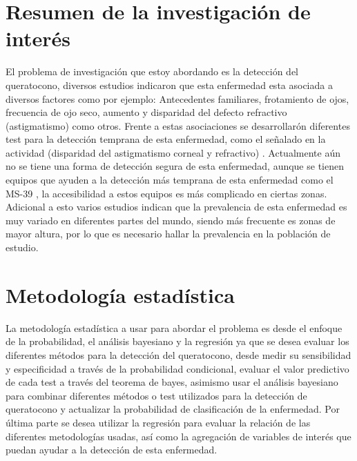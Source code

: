 
\newpage

\section{Resumen de la investigación de interés}
El problema de investigación que estoy abordando es la detección del queratocono, diversos estudios indicaron que esta enfermedad esta asociada a diversos factores como por ejemplo: Antecedentes familiares, frotamiento de ojos, frecuencia de ojo seco, aumento y disparidad del defecto refractivo (astigmatismo) como otros. Frente a estas asociaciones se desarrollarón diferentes test para la detección temprana de esta enfermedad, como el señalado en la actividad (disparidad del astigmatismo corneal y refractivo) \cite{sinjab2021corneal}. Actualmente aún no se tiene una forma de detección segura de esta enfermedad, aunque se tienen equipos que ayuden a la detección más temprana de esta enfermedad como el MS-39 \cite{elkitkat2022accuracy}, la accesibilidad a estos equipos es más complicado en ciertas zonas. Adicional a esto varios estudios indican que la prevalencia de esta enfermedad es muy variado en diferentes partes del mundo, siendo más frecuente es zonas de mayor altura, por lo que es necesario hallar la prevalencia en la población de estudio.

\section{Metodología estadística}
La metodología estadística a usar para abordar el problema es desde el enfoque de la probabilidad, el análisis bayesiano y la regresión ya que se desea evaluar los diferentes métodos para la detección del queratocono, desde medir su sensibilidad y especificidad a través de la probabilidad condicional, evaluar el valor predictivo de cada test a través del teorema de bayes, asimismo usar el análisis bayesiano para combinar diferentes métodos o test utilizados para la detección de queratocono y actualizar la probabilidad de clasificación de la enfermedad. Por última parte se desea utilizar la regresión para evaluar la relación de las diferentes metodologías usadas, así como la agregación de variables de interés que puedan ayudar a la detección de esta enfermedad. \cite{peck2006statistics}

